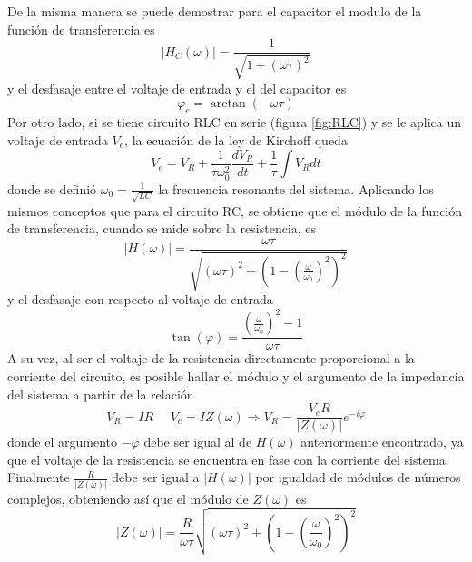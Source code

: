 De la misma manera se puede demostrar para el capacitor el modulo de la función de transferencia es
\begin{equation}
    |H_C(\omega)|=\frac{1}{\sqrt{1+(\omega\tau)^2}}
\end{equation}
y el desfasaje entre el voltaje de entrada y el del capacitor es
\begin{equation}
    \varphi_c=\arctan(- \omega\tau)
    \label{eq:4}
\end{equation}
    Por otro lado, si se tiene circuito RLC en serie (figura \ref{fig:RLC}) y se le 
aplica un voltaje de entrada $V_e$, la ecuación de la ley de Kirchoff queda
\begin{equation}
    V_e=V_R+\frac{1}{\tau\omega_0^2}\frac{dV_R}{dt}+\frac{1}{\tau}\int V_Rdt
\end{equation}
    donde se definió $\omega_0=\frac{1}{\sqrt{LC}}$ la frecuencia resonante del sistema. Aplicando los mismos conceptos que para el circuito RC, se obtiene que el módulo de la función de transferencia, cuando se mide sobre la resistencia, es
\begin{equation}
    |H(\omega)|= \frac{\omega\tau}{\sqrt{(\omega\tau)^2+(1-(\frac{\omega}{\omega_0})^2)^2}}
    \label{eq:moduloRLC}
\end{equation}
y el desfasaje con respecto al voltaje de entrada
\begin{equation}
    \tan(\varphi)=\frac{(\frac{\omega}{\omega_0})^2-1}{\omega\tau}
    \label{eq:desfasajeRLC}
\end{equation}
    A su vez, al ser el voltaje de la resistencia directamente proporcional a la corriente del circuito, es posible hallar el módulo y el argumento de la impedancia del sistema a partir de la relación
    \begin{equation}
        V_R=IR \ \ \ \ \ \ V_e=IZ(\omega) \Longrightarrow V_R=\frac{V_eR}{|Z(\omega)|}e^{-i\varphi}
    \end{equation}
    donde el argumento $-\varphi$ debe ser igual al de $H(\omega)$ anteriormente encontrado, ya que el voltaje de la resistencia se encuentra en fase con la corriente del sistema. Finalmente $\frac{R}{|Z(\omega)|}$ debe ser igual a $|H(\omega)|$ por igualdad de módulos de números complejos, obteniendo así que el módulo de $Z(\omega)$ es
    \begin{equation}
        |Z(\omega)|=\frac{R}{\omega\tau} \sqrt{(\omega\tau)^2+\left(1-\left(\frac{\omega}{\omega_0}\right)^2\right)^2}
        \label{imp RCL}
    \end{equation}
      



